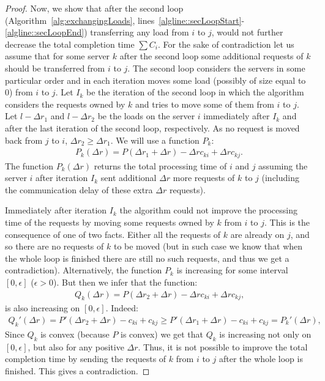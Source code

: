 \documentclass[11pt]{article}
\begin{document}
\begin{proof}
Now, we show that after the second loop (Algorithm~\ref{alg:exchangingLoads}, lines~\ref{algline::secLoopStart}-\ref{algline::secLoopEnd}) transferring any load from $i$ to $j$, would not further decrease the total completion time $\sum C_{i}$. 
For the sake of contradiction let us assume that for some server $k$ after the second loop some additional requests of $k$ should be transferred from $i$ to $j$.
The second loop considers the servers in some particular order and in each iteration moves some load (possibly of size equal to 0) from $i$ to $j$.
Let $I_k$ be the iteration of the second loop in which the algorithm considers the requests owned by $k$ and tries to move some of them from $i$ to $j$.
Let $l - \Delta r_1$ and $l - \Delta r_2$ be the loads on the server $i$ immediately after $I_k$ and after the last iteration of the second loop, respectively.
As no request is moved back from $j$ to $i$, $\Delta r_2 \geq \Delta r_1$.
We will use a function $P_k$:
\begin{align*}
P_k(\Delta r) = P(\Delta r_1 + \Delta r) - \Delta r c_{ki} + \Delta r c_{kj} \textrm{.}
\end{align*}
The function $P_k(\Delta r)$ returns the total processing time of $i$ and $j$ assuming the server $i$ after iteration $I_k$ sent additional $\Delta r$ more requests of $k$ to $j$ (including the communication delay of these extra $\Delta r$ requests).

Immediately after iteration $I_k$ the algorithm could not improve the processing time of the requests by moving some requests owned by $k$ from $i$ to $j$. This is the consequence of one of two facts. Either all the requests of $k$ are already on $j$, and so there are no requests of $k$ to be moved (but in such case we know that when the whole loop is finished there are still no such requests, and thus we get a contradiction). Alternatively, the function $P_k$ is increasing for some interval $[0, \epsilon]$ ($\epsilon > 0$). But then we infer that the function:
\begin{align*}
Q_k(\Delta r) = P(\Delta r_2 + \Delta r) - \Delta r c_{ki} + \Delta r c_{kj} \textrm{,}
\end{align*}
is also increasing on $[0, \epsilon]$. Indeed:
\begin{align*}
Q_k'(\Delta r) = P'(\Delta r_2 + \Delta r) - c_{ki} + c_{kj} \geq P'(\Delta r_1 + \Delta r) - c_{ki} + c_{kj} = P_k'(\Delta r)\textrm{,}
\end{align*}
Since $Q_k$ is convex (because $P$ is convex) we get that $Q_k$ is increasing not only on $[0, \epsilon]$, but also for any positive $\Delta r$. Thus, it is not possible to improve the total completion time by sending the requests of $k$ from $i$ to $j$ after the whole loop is finished. This gives a contradiction.


\end{proof}
\end{document}
